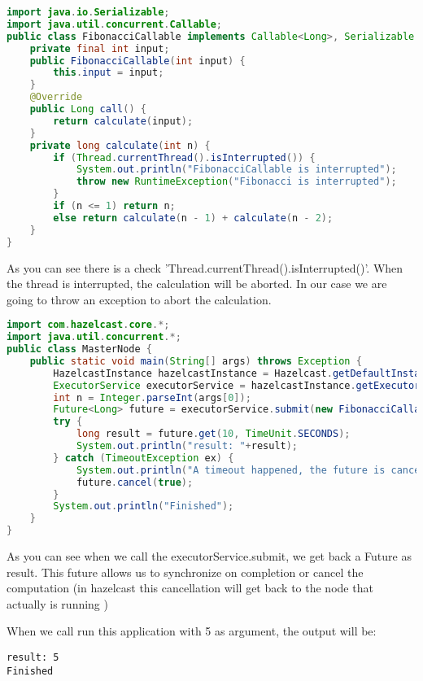 \begin{lstlisting}[language=java]
import java.io.Serializable;
import java.util.concurrent.Callable;
public class FibonacciCallable implements Callable<Long>, Serializable {
    private final int input;
    public FibonacciCallable(int input) {
        this.input = input;
    }
    @Override
    public Long call() {
        return calculate(input);
    }
    private long calculate(int n) {
        if (Thread.currentThread().isInterrupted()) {
            System.out.println("FibonacciCallable is interrupted");
            throw new RuntimeException("Fibonacci is interrupted");
        }
        if (n <= 1) return n;
        else return calculate(n - 1) + calculate(n - 2);
    }
}
\end{lstlisting}

As you can see there is a check 'Thread.currentThread().isInterrupted()'. When the thread is interrupted, the calculation will be aborted. In our case we are going to throw an exception to abort the calculation.

\begin{lstlisting}[language=java]
import com.hazelcast.core.*;
import java.util.concurrent.*;
public class MasterNode {
    public static void main(String[] args) throws Exception {
        HazelcastInstance hazelcastInstance = Hazelcast.getDefaultInstance();
        ExecutorService executorService = hazelcastInstance.getExecutorService();
        int n = Integer.parseInt(args[0]);
        Future<Long> future = executorService.submit(new FibonacciCallable(n));
        try {
            long result = future.get(10, TimeUnit.SECONDS);
            System.out.println("result: "+result);
        } catch (TimeoutException ex) {
            System.out.println("A timeout happened, the future is cancelled");
            future.cancel(true);
        }
        System.out.println("Finished");
    }
}
\end{lstlisting}
As you can see when we call the executorService.submit, we get back a Future as result. This future allows us to synchronize on completion or cancel the computation (in hazelcast this cancellation will get back to the node that actually is running )

When we call run this application with 5 as argument, the output will be: 
\begin{verbatim}
result: 5
Finished
\end{verbatim}

